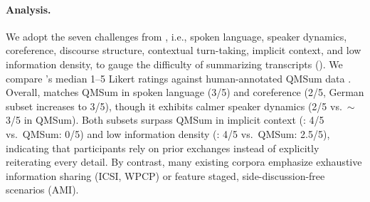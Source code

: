 \paragraph{Analysis.}
We adopt the seven challenges from \citet{KirsteinWRG24a}, i.e., spoken language, speaker dynamics, coreference, discourse structure, contextual turn-taking, implicit context, and low information density, to gauge the difficulty of summarizing \dataset{} transcripts ().
We compare \dataset{}’s median 1–5 Likert ratings against human-annotated QMSum data \cite{KirsteinWRG24a}.
Overall, \dataset{} matches QMSum in spoken language (3/5) and coreference (2/5, German subset increases to 3/5), though it exhibits calmer speaker dynamics (2/5 vs.\ $\sim$3/5 in QMSum).
Both \dataset{} subsets surpass QMSum in implicit context (\dataset{}: 4/5 vs.\ QMSum: 0/5) and low information density (\dataset{}: 4/5 vs.\ QMSum: 2.5/5), indicating that participants rely on prior exchanges instead of explicitly reiterating every detail.
By contrast, many existing corpora emphasize exhaustive information sharing (ICSI, WPCP) or feature staged, side-discussion-free scenarios (AMI).



